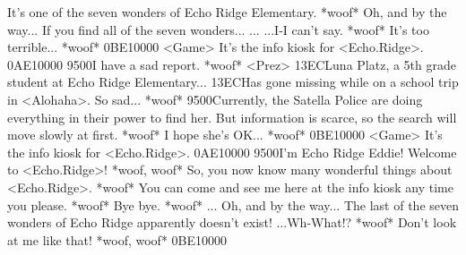 It's one of the seven wonders of Echo Ridge Elementary. *woof* 
Oh, and by the way... 
If you find all of the seven wonders... 
... 
...I-I can't say. *woof* It's too terrible... *woof* 
{0B}{E1}{00}{00}
<Game> It's the info kiosk for <Echo.Ridge>. 
{0A}{E1}{00}{00} 
{95}{00}I have a sad report. *woof* 
<Prez> {13}{EC}Luna Platz, a 5th grade student at Echo Ridge Elementary... 
{13}{EC}Has gone missing while on a school trip in <Alohaha>. So sad... *woof* 
{95}{00}Currently, the Satella Police are doing everything in their power to find her. 
But information is scarce, so the search will move slowly at first. *woof* 
I hope she's OK... *woof* 
{0B}{E1}{00}{00}
<Game> It's the info kiosk for <Echo.Ridge>. 
{0A}{E1}{00}{00} 
{95}{00}I'm Echo Ridge Eddie! Welcome to <Echo.Ridge>! 
*woof, woof* 
So, you now know many wonderful things about <Echo.Ridge>. *woof* 
You can come and see me here at the info kiosk any time you please. *woof* 
Bye bye. *woof* 
... 
Oh, and by the way... The last of the seven 
wonders of Echo Ridge apparently doesn't exist! 
...Wh-What!? *woof* 
Don't look at me like that! 
*woof, woof* 
{0B}{E1}{00}{00}
